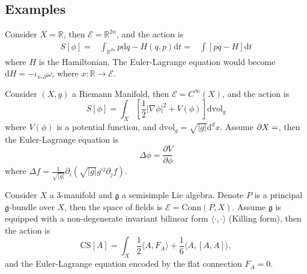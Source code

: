 \documentclass[10pt]{article}
\begin{document}
\subsection{Examples}

\begin{example}
  Consider $ X = \mathbb{R}$, then $ \mathcal{E} = \mathbb{R}^{2n}$, and the action is
  \begin{equation*}
    \begin{aligned}
      S[\phi] = & \int _{\mathbb{R}^{2n}} p \mathrm{d} q - H(q,p) \mathrm{d} t
      = & \int \left[ p \dot{q} - H \right]\mathrm{d} t
    \end{aligned}
  \end{equation*}
  where $ H$ is the Hamiltonian. The Euler-Lagrange equation would become $ \mathrm{d} H = - \iota_{x_{*} \partial} \omega$, where $ x: \mathbb{R}\rightarrow \mathcal{E}$.
\end{example}

\begin{example}
  Consider $(X,g)$ a Riemann Manifold, then $ \mathcal{E} = C^{\infty }(X)$, and the action is
  \begin{equation*}
    S[\phi] = \int _{X} \left[ \frac{1}{2} \left| \nabla \phi \right|^{2} + V(\phi) \right] \mathrm{d} \mathrm{vol}_{g}
  \end{equation*}
  where $ V(\phi)$ is a potential function, and $ \mathrm{d} \mathrm{vol}_{g} = \sqrt{\left| g \right|} \mathrm{d}^{d} x$. Assume $\partial X = \empty$, then the Euler-Lagrange equation is
  \begin{equation*}
    \Delta \phi = \frac{\partial V}{\partial \phi}
  \end{equation*}
  where $ \Delta f = \frac{1}{\sqrt{\left| g \right|}} \partial_{i}\left( \sqrt{\left| g \right|} g^{ij} \partial_{j} f\right)$.
\end{example}

\begin{example}
  Consider $ X$ a 3-manifold and $ \mathfrak{g}$ a semisimple Lie algebra. Denote $ P$ is a principal $ \mathfrak{g}$-bundle over $ X$, then the space of fields is $ \mathcal{E} = \mathrm{Conn}(P,X)$. Assume $ \mathfrak{g}$ is equipped with a non-degenerate invariant bilinear form $ \langle \cdot, \cdot \rangle$ (Killing form), then the action is
  \begin{equation*}
    \mathrm{CS}[A] = \int _{X} \frac{1}{2} \langle A, F_{A} \rangle + \frac{1}{6} \langle A, [A,A] \rangle,
  \end{equation*}
  and the Euler-Lagrange equation encoded by the flat connection $ F_{A} = 0$.
\end{example}
\end{document}
